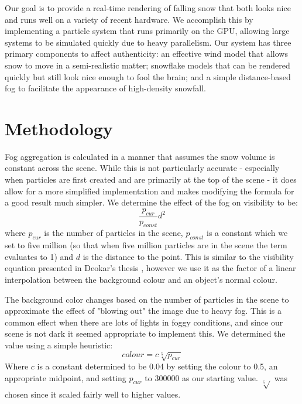 \documentclass[conference]{acmsiggraph}
\begin{document}
Our goal is to provide a real-time rendering of falling snow that both looks nice and runs well on a variety of recent hardware. We accomplish this by implementing a particle system that runs primarily on the GPU, allowing large systems to be simulated quickly due to heavy parallelism. Our system has three primary components to affect authenticity: an effective wind model that allows snow to move in a semi-realistic matter; snowflake models that can be rendered quickly but still look nice enough to fool the brain; and a simple distance-based fog to facilitate the appearance of high-density snowfall.

\section{Methodology}
Fog aggregation is calculated in a manner that assumes the snow volume is constant across the scene. While this is not particularly accurate - especially when particles are first created and are primarily at the top of the scene - it does allow for a more simplified implementation and makes modifying the formula for a good result much simpler. We determine the effect of the fog on visibility to be:
\begin{equation} \label{eq:fog}
\frac{p_{cur}}{p_{const}}d^2
\end{equation}
where $p_{cur}$ is the number of particles in the scene, $p_{const}$ is a constant which we set to five million (so that when five million particles are in the scene the term evaluates to 1) and $d$ is the distance to the point. This is similar to the visibility equation presented in Deokar's thesis \cite{deokar09}, however we use it as the factor of a linear interpolation between the background colour and an object's normal colour.

The background color changes based on the number of particles in the scene to approximate the effect of "blowing out" the image due to heavy fog. This is a common effect when there are lots of lights in foggy conditions, and since our scene is not dark it seemed appropriate to implement this. We determined the value using a simple heuristic:
\begin{equation} \label{eq:bgcolor}
colour = c\sqrt[5]{p_{cur}}
\end{equation}
Where $c$ is a constant determined to be 0.04 by setting the colour to 0.5, an appropriate midpoint, and setting $p_{cur}$ to 300000 as our starting value. $\sqrt[5]{}$ was chosen since it scaled fairly well to higher values.
\end{document}
